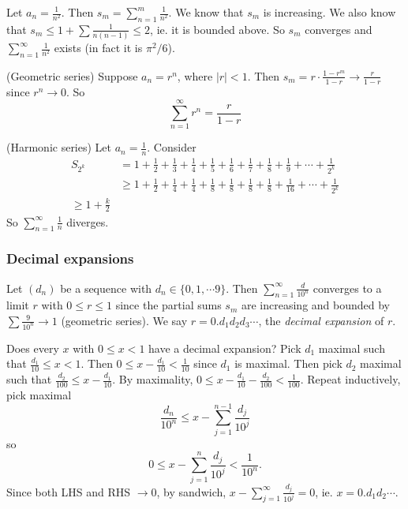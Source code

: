 \documentclass[a4paper]{article}
\begin{document}
  \begin{eg}
    Let $a_n = \frac{1}{n^2}$. Then $s_m = \sum_{n = 1}^{m} \frac{1}{n^2}$. We know that $s_m$ is increasing. We also know that $s_m \leq 1 + \sum \frac{1}{n(n -1)} \leq 2$, ie. it is bounded above. So $s_m$ converges and $\sum_{n = 1}^{\infty} \frac{1}{n^2}$ exists (in fact it is $\pi^2/6$).
  \end{eg}

  \begin{eg}
    (Geometric series) Suppose $a_n = r^n$, where $|r| < 1$. Then $s_m = r\cdot \frac{1 - r^m}{1 - r} \to \frac{r}{1- r}$ since $r^n \to 0$. So
    \[
      \sum_{n = 1}^\infty r^n = \frac{r}{1 - r}
    \]
  \end{eg}

  \begin{eg}
    (Harmonic series) Let $a_n = \frac{1}{n}$. Consider
    \begin{align*}
      S_{2^k} &= 1 + \frac{1}{2} + \frac{1}{3} + \frac{1}{4} + \frac{1}{5} + \frac{1}{6} + \frac{1}{7} + \frac{1}{8} + \frac{1}{9} + \cdots + \frac{1}{2^k}\\
      & \geq 1 + \frac{1}{2} + \frac{1}{4} + \frac{1}{4} + \frac{1}{8} + \frac{1}{8} + \frac{1}{8} + \frac{1}{8} + \frac{1}{16} + \cdots + \frac{1}{2^k}\\
      \geq 1 + \frac{k}{2}
    \end{align*}
    So $\displaystyle \sum_{n = 1}^\infty\frac{1}{n}$ diverges.
  \end{eg}

  \subsubsection{Decimal expansions}
  \begin{defi}
    Let $(d_n)$ be a sequence with $d_n\in \{0, 1, \cdots 9\}$. Then $\displaystyle \sum_{n = 1}^\infty \frac{d}{10^n}$ converges to a limit $r$ with $0 \leq r \leq 1$ since the partial sums $s_m$ are increasing and bounded by $\sum \frac{9}{10^n}\to 1$ (geometric series). We say $r = 0.d_1d_2d_3\cdots$, the \emph{decimal expansion} of $r$.
  \end{defi}

  Does every $x$ with $0 \leq x < 1$ have a decimal expansion?
  Pick $d_1$ maximal such that $\frac{d_1}{10} \leq x < 1$. Then $0 \leq x - \frac{d_1}{10} < \frac{1}{10}$ since $d_1$ is maximal. Then pick $d_2$ maximal such that $\frac{d_2}{100} \leq x - \frac{d_1}{10}$. By maximality, $0 \leq x - \frac{d_1}{10} - \frac{d_2}{100}  < \frac{1}{100}$. Repeat inductively, pick maximal 
  \[
    \frac{d_n}{10^n} \leq x- \sum_{j = 1}^{n - 1} \frac{d_j}{10^j}
  \]
  so
  \[
    0 \leq x - \sum_{j = 1}^n \frac{d_j}{10^j} < \frac{1}{10^n}.
  \]
  Since both LHS and RHS $\to 0$, by sandwich, $x - \sum_{j = 1}^\infty \frac{d_j}{10^j} = 0$, ie. $x = 0.d_1d_2\cdots$.
\end{document}

